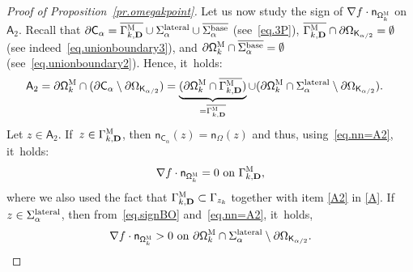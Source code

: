 \documentclass[10pt]{amsart}
\newcommand{\mbf}[1]{\mathbf{#1}}
\let\pa\partial
\theoremstyle{plain}
\theoremstyle{definition}
\begin{document}
\begin{proof}[Proof of Proposition~\ref{pr.omegakpoint}]
Let us now study the sign of $\nabla f\cdot \mathsf n_{ \mathsf \Omega_k^{\textsc{M}}}$ on $\mathsf A_2$.
Recall that $\pa \mathsf C_\alpha = \overline{\Gamma_{k,\mbf D}^{\textsc{M}} }\cup { \Sigma_\alpha^{\textup{lateral}} }\cup \overline{ \Sigma_\alpha^{\textup{base}}}$ (see~\eqref{eq.3P}), $\overline{\Gamma_{k,\mbf D}^{\textsc{M}} } \cap \partial \Omega_{\mathsf K_{\alpha/2}} =\emptyset$ (see indeed~\eqref{eq.unionboundary3}), and $\pa \mathsf \Omega_k^{\textsc{M}} \cap \overline{ \Sigma_\alpha^{\textup{base}}}=\emptyset$ (see~\eqref{eq.unionboundary2}). Hence, it~holds:
\begin{align}\label{eq.=A2}
\mathsf A_2=\pa \mathsf \Omega_k^{\textsc{M}}\cap (\pa \mathsf C_\alpha \setminus \partial \Omega_{\mathsf K_{\alpha/2}}) &=\underbrace{(\pa \mathsf \Omega_k^{\textsc{M}} \cap \overline{\Gamma_{k,\mbf D}^{\textsc{M}} })}_{=\overline{\Gamma_{k,\mbf D}^{\textsc{M}} }} \cup (\pa \mathsf \Omega_k^{\textsc{M}} \cap {\Sigma_\alpha^{\textup{lateral}} }\setminus \partial \Omega_{\mathsf K_{\alpha/2}}).
\end{align}
Let $z\in \mathsf A_2$. If~$z\in \Gamma_{k,\mbf D}^{\textsc{M}} $, then $ \mathsf n_{ \mathsf C_\alpha}(z) =\mathsf n_\Omega(z)$ and thus, using~\eqref{eq.nn=A2}, it~holds:
\begin{equation}\label{eq.panf2}
\nabla f\cdot \mathsf n_{ \mathsf \Omega_k^{\textsc{M}}}=0\text{ on } {\Gamma_{k,\mbf D}^{\textsc{M}} },
\end{equation}
where we also used the fact that $\Gamma_{k,\mbf D}^{\textsc{M}} \subset \Gamma_{z_k}$ together with item \eqref{A2} in \ref{A}. If~$z\in \Sigma_\alpha^{\textup{lateral}}$, then from~\eqref{eq.signBO} and~\eqref{eq.nn=A2}, it~holds,
\begin{equation}\label{eq.panf3}
\nabla f\cdot \mathsf n_{ \mathsf \Omega_k^{\textsc{M}}}>0\text{ on }\pa \mathsf \Omega_k^{\textsc{M}} \cap {\Sigma_\alpha^{\textup{lateral}} }\setminus \partial \Omega_{\mathsf K_{\alpha/2}}.
\end{equation}


\end{proof}
\end{document}
